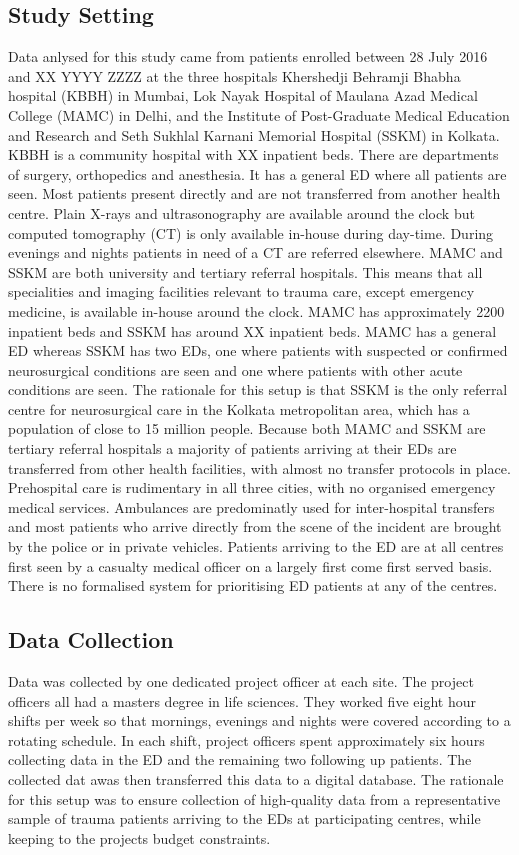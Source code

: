 \documentclass[10pt,letterpaper]{article}\usepackage[]{graphicx}\usepackage[]{color}
\begin{document}
\subsection*{Study Setting}
Data anlysed for this study came from patients enrolled between 28 July 2016 and
XX YYYY ZZZZ at the three hospitals Khershedji Behramji Bhabha hospital (KBBH)
in Mumbai, Lok Nayak Hospital of Maulana Azad Medical College (MAMC) in Delhi,
and the Institute of Post-Graduate Medical Education and Research and Seth
Sukhlal Karnani Memorial Hospital (SSKM) in Kolkata. KBBH is a community
hospital with XX inpatient beds. There are departments of surgery, orthopedics
and anesthesia. It has a general ED where all patients are seen. Most patients
present directly and are not transferred from another health centre. Plain
X-rays and ultrasonography are available around the clock but computed
tomography (CT) is only available in-house during day-time. During evenings and
nights patients in need of a CT are referred elsewhere. MAMC and SSKM are both
university and tertiary referral hospitals. This means that all specialities and
imaging facilities relevant to trauma care, except emergency medicine, is
available in-house around the clock. MAMC has approximately 2200 inpatient beds
and SSKM has around XX inpatient beds. MAMC has a general ED whereas SSKM has
two EDs, one where patients with suspected or confirmed neurosurgical conditions
are seen and one where patients with other acute conditions are seen. The
rationale for this setup is that SSKM is the only referral centre for
neurosurgical care in the Kolkata metropolitan area, which has a population of
close to 15 million people. Because both MAMC and SSKM are tertiary referral
hospitals a majority of patients arriving at their EDs are transferred from
other health facilities, with almost no transfer protocols in place. Prehospital
care is rudimentary in all three cities, with no organised emergency medical
services. Ambulances are predominatly used for inter-hospital transfers and most
patients who arrive directly from the scene of the incident are brought by the
police or in private vehicles. Patients arriving to the ED are at all centres
first seen by a casualty medical officer on a largely first come first served
basis. There is no formalised system for prioritising ED patients at any of the
centres.

\subsection*{Data Collection}
Data was collected by one dedicated project officer at each site. The project
officers all had a masters degree in life sciences. They worked five eight hour
shifts per week so that mornings, evenings and nights were covered according to
a rotating schedule. In each shift, project officers spent approximately six
hours collecting data in the ED and the remaining two following up patients. The
collected dat awas then transferred this data to a digital database. The
rationale for this setup was to ensure collection of high-quality data from a
representative sample of trauma patients arriving to the EDs at participating
centres, while keeping to the projects budget constraints.
\end{document}
